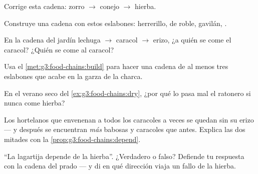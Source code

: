 \begin{exercise}[$\star$]\label{exo:g3:food-chains:4}
Corrige esta cadena: zorro $\rightarrow$ conejo $\rightarrow$ hierba.
\end{exercise}

\begin{exercise}[$\star$]\label{exo:g3:food-chains:5}
Construye una cadena con estos eslabones: herrerillo,  de roble,
gavilán, .
\end{exercise}

\begin{exercise}[$\star$]\label{exo:g3:food-chains:6}
En la cadena del jardín lechuga $\rightarrow$ caracol $\rightarrow$
erizo, ¿a quién se come el caracol? ¿Quién se come al caracol?
\end{exercise}

\begin{exercise}[$\star$]\label{exo:g3:food-chains:7}
Usa el \cref{met:g3:food-chains:build} para hacer una cadena de al
menos tres eslabones que acabe en la garza de la charca.
\end{exercise}

\begin{exercise}[$\star$]\label{exo:g3:food-chains:8}
En el verano seco del \cref{ex:g3:food-chains:dry}, ¿por qué lo pasa
mal el ratonero si nunca come hierba?
\end{exercise}

\begin{exercise}[$\star\star$]\label{exo:g3:food-chains:9}
Los hortelanos que envenenan a todos los caracoles a veces se quedan
sin su erizo --- y después se encuentran \emph{más} babosas y
caracoles que antes. Explica las dos mitades con la
\cref{prop:g3:food-chains:depend}.
\end{exercise}

\begin{exercise}[$\star\star$]\label{exo:g3:food-chains:10}
``La lagartija depende de la hierba''. ¿Verdadero o falso? Defiende tu
respuesta con la cadena del prado --- y di en qué dirección viaja un
fallo de la hierba.
\end{exercise}
